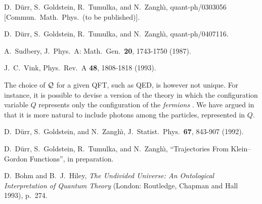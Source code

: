 \documentclass[12pt, showpacs, superscriptaddress]{revtex4-2}%
\begin{document}
\begin{thebibliography}{28.}
 D.~D\"urr, S.~Goldstein, R.~Tumulka, and
   N.~Zangh{\`\i}, %
   quant-ph/0303056 [Commun.\ Math.\ Phys.\ (to be published)].

 D.~D\"urr, S.~Goldstein, R.~Tumulka, and
   N.~Zangh{\`\i}, %
   quant-ph/0407116.

 A.~Sudbery, %
   J.\ Phys.\ A: Math.\ Gen.\ \textbf{20}, 1743-1750 (1987).

 J.~C.~Vink,
   Phys.\ Rev.\ A \textbf{48}, 1808-1818 (1993).

 The choice of $\mathcal{Q}$ for a given QFT, such as QED, is
however not unique. For instance, it is possible to devise a version
of the theory in which the configuration variable $Q$ represents only
the configuration of the \emph{fermions} \cite{BellBeables}.  We have
argued in \cite{crea1} that it is more natural to include photons
among the particles, represented in $Q$.

 D.~D\"urr, S.~Goldstein, and N.~Zangh{\`\i}, 
   J.\ Statist.\ Phys.\ \textbf{67}, 843-907 (1992).

 D.~D\"urr, S.~Goldstein, R.~Tumulka, and N.~Zangh{\`\i},
   ``Trajectories From Klein--Gordon Functions'', in preparation.

 D.~Bohm and B.~J.~Hiley, \textit{The Undivided Universe: An
   Ontological Interpretation of Quantum Theory} (London: Routledge,
   Chapman and Hall 1993), p.~274.







\end{thebibliography}
\end{document}
